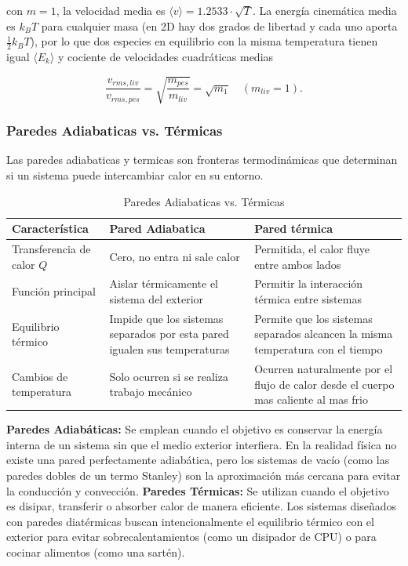 \documentclass{article}
\begin{document}
con $m=1$, la velocidad media es $\langle v\rangle=1.2533\cdot \sqrt{T}$. La energía cinemática media es $k_BT$ para cualquier masa (en 2D hay dos grados de libertad y cada uno aporta $\frac{1}{2}k_BT$), por lo que dos especies en equilibrio con la misma temperatura tienen igual $\langle E_k\rangle$ y cociente de velocidades cuadráticas medias
\begin{center}
    $$\frac{v_{rms,liv}}{v_{rms,pes}}=\sqrt{\frac{m_{pes}}{m_{liv}}}=\sqrt{m_1}\quad(m_{liv}=1).$$
\end{center}

\subsubsection{Paredes Adiabaticas vs. Térmicas}
Las paredes adiabaticas y termicas son fronteras termodinámicas que determinan si un sistema puede intercambiar calor en su entorno.

\begin{table}[h]
\centering
\renewcommand{\arraystretch}{1.3} 
\caption{Paredes Adiabaticas vs. Térmicas}
\begin{tabularx}{\textwidth}{ | Y | Y | Y | }
    \hline
    \textbf{Característica} & \textbf{Pared Adiabatica} & \textbf{Pared térmica}  \\
    \hline
    Transferencia de calor $Q$ & Cero, no entra ni sale calor & Permitida, el calor fluye entre ambos lados \\
    \hline
    Función principal & Aislar térmicamente el sistema del exterior & Permitir la interacción térmica entre sistemas \\
    \hline
    Equilibrio térmico & Impide que los sistemas separados por esta pared igualen sus temperaturas & Permite que los sistemas separados alcancen la misma temperatura con el tiempo \\
    \hline
    Cambios de temperatura & Solo ocurren si se realiza trabajo mecánico & Ocurren naturalmente por el flujo de calor desde el cuerpo mas caliente al mas frio \\
    \hline
\end{tabularx}
\end{table}

\textbf{Paredes Adiabáticas:} Se emplean cuando el objetivo es conservar la energía interna de un sistema sin que el medio exterior interfiera. En la realidad física no existe una pared perfectamente adiabática, pero los sistemas de vacío (como las paredes dobles de un termo Stanley) son la aproximación más cercana para evitar la conducción y convección.
\textbf{Paredes Térmicas:} Se utilizan cuando el objetivo es disipar, transferir o absorber calor de manera eficiente. Los sistemas diseñados con paredes diatérmicas buscan intencionalmente el equilibrio térmico con el exterior para evitar sobrecalentamientos (como un disipador de CPU) o para cocinar alimentos (como una sartén).
\end{document}
